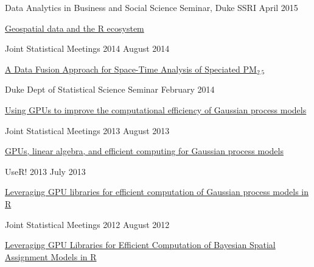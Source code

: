 \documentclass[margin,line]{res}
\begin{document}
\begin{resume}
Data Analytics in Business and Social Science Seminar, Duke SSRI \hfill April 2015
\begin{list1}
\item[] \href{https://github.com/rundel/Presentations/tree/master/Duke%202015%20-%20DABSS}{Geospatial data and the R ecosystem}
\end{list1}
\vspace{-2mm}

Joint Statistical Meetings 2014 \hfill August 2014
\begin{list1}
\item[] \href{https://github.com/rundel/Presentations/tree/master/JSM%202014}{A Data Fusion Approach for Space-Time Analysis of Speciated PM$_{2.5}$}
\end{list1}
\vspace{-2mm}

Duke Dept of Statistical Science Seminar \hfill February 2014
\begin{list1}
\item[] \href{https://github.com/rundel/Presentations/tree/master/Duke%202014}{Using GPUs to improve the computational efficiency of Gaussian process models}
\end{list1}
\vspace{-2mm}


Joint Statistical Meetings 2013 \hfill August 2013
\begin{list1}
\item[] \href{https://github.com/rundel/Presentations/tree/master/JSM%202013}{GPUs, linear algebra, and efficient computing for Gaussian process models}
\end{list1}
\vspace{-2mm}

UseR! 2013 \hfill July 2013
\begin{list1}
\item[] \href{https://github.com/rundel/Presentations/tree/master/UseR2013}{Leveraging GPU libraries for efficient computation of Gaussian process models in R}
\end{list1}
\vspace{-2mm}

Joint Statistical Meetings 2012 \hfill August 2012
\begin{list1}
\item[] \href{https://github.com/rundel/Presentations/tree/master/JSM%202012}{Leveraging GPU Libraries for Efficient Computation of Bayesian Spatial Assignment Models in R}
\end{list1}
\vspace{-2mm}


\end{resume}
\end{document}
